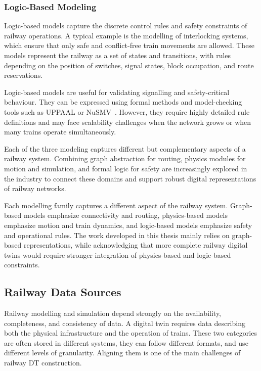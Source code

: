 
\subsubsection{Logic-Based Modeling}
Logic-based models capture the discrete control rules and safety constraints of railway operations. A typical example is 
the modelling of interlocking systems, which ensure that only safe and conflict-free train movements are allowed. 
These models represent the railway as a set of states and transitions, with rules depending on the position of switches, 
signal states, block occupation, and route reservations.

Logic-based models are useful for validating signalling and safety-critical behaviour. They can be expressed using formal 
methods and model-checking tools such as UPPAAL or NuSMV~\cite{uppaal, nusmv}. However, they require highly detailed rule 
definitions and may face scalability challenges when the network grows or when many trains operate simultaneously.

Each of the three modeling captures different but complementary aspects of a railway system. Combining graph abstraction 
for routing, physics modules for motion and simulation, and formal logic for safety are increasingly explored in the 
industry to connect these domains and support robust digital representations of railway networks.

Each modelling family captures a different aspect of the railway system. Graph-based models emphasize connectivity and routing, physics-based models emphasize 
motion and train dynamics, and logic-based models emphasize safety and operational rules. The work developed in this 
thesis mainly relies on graph-based representations, while acknowledging that more complete railway digital twins would 
require stronger integration of physics-based and logic-based constraints.

\subsection{Railway Data Sources}
Railway modelling and simulation depend strongly on the availability, completeness, and consistency of data. A digital 
twin requires data describing both the physical infrastructure and the operation of trains. These two categories are often 
stored in different systems, they can follow different formats, and use different levels of granularity. Aligning them is 
one of the main challenges of railway DT construction.


